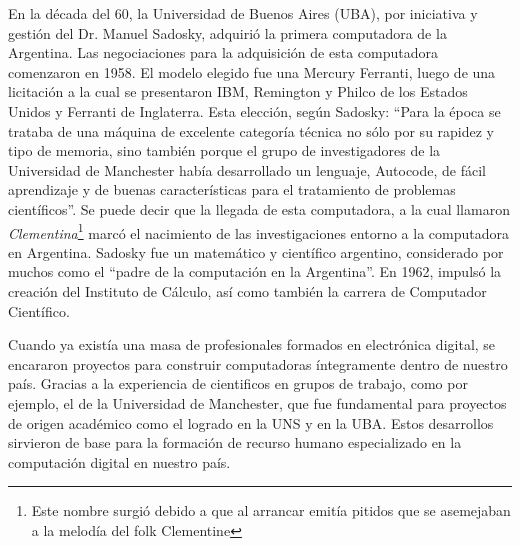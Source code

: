 \documentclass[%
 	final,
%
	notitlepage,
	narroweqnarray,
	inline,
 	twoside,
	]{ieee}
\begin{document}
En la d\'ecada del 60, la Universidad de Buenos Aires (UBA), por iniciativa y gesti\'on del Dr. Manuel Sadosky\cite{sadosky}, adquiri\'o la primera computadora de la Argentina.
Las negociaciones para la adquisici\'on de esta computadora comenzaron en 1958. El modelo elegido fue una Mercury Ferranti, luego de una licitaci\'on a la cual se presentaron IBM, Remington y Philco de los Estados Unidos y Ferranti de Inglaterra. Esta elecci\'on, seg\'un Sadosky: ``Para la \'epoca se trataba de una m\'aquina de excelente categor\'ia t\'ecnica no s\'olo por su rapidez y tipo de memoria, sino tambi\'en porque el grupo de investigadores de la Universidad de Manchester hab\'ia desarrollado un lenguaje, Autocode, de f\'acil aprendizaje y de buenas caracter\'isticas para el tratamiento de problemas cient\'ificos''.
Se puede decir que la llegada de esta computadora, a la cual llamaron \textit{Clementina}\footnote{Este nombre surgi\'o debido a que al arrancar emit\'ia pitidos que se asemejaban a la melod\'ia del folk Clementine} marc\'o el nacimiento de las investigaciones entorno a la computadora en Argentina.
Sadosky fue un matem\'atico y cient\'ifico argentino, considerado por muchos como el ``padre de la computaci\'on en la Argentina''.
En 1962, impuls\'o la creaci\'on del Instituto de C\'alculo, as\'i como tambi\'en la carrera de Computador Cient\'ifico.

Cuando ya exist\'ia una masa de profesionales formados en electr\'onica digital, se encararon proyectos para construir computadoras \'integramente dentro de nuestro pa\'is. Gracias a la experiencia de cientificos en grupos de trabajo, como por ejemplo, el de la Universidad de Manchester, que fue fundamental para proyectos de origen acad\'emico como el logrado en la UNS y en la UBA. Estos desarrollos sirvieron de base para la formaci\'on de recurso humano especializado en la computaci\'on digital en nuestro pa\'is.



\end{document}
